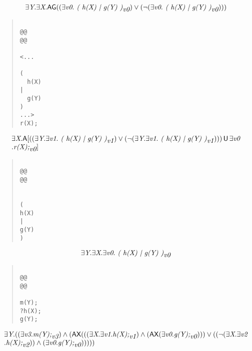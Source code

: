 \documentclass{article}
\newcommand{\U}{\,\mbox{\sf{U}}\,}
\newcommand{\A}{\mbox{\sf{A}}}
\newcommand{\AX}{\mbox{\sf{AX}}}
\newcommand{\AG}{\mbox{\sf{AG}}}
\newcommand{\mita}[1]{\mbox{\it{{#1}}}}
\begin{document}
\[\begin{array}{l}
\exists \mita{Y} . \exists \mita{X} . \AG((\exists \mita{v0} . \mita{
(
h(X)
|
g(Y)
)}_{\mita{v0}}) \vee (\neg (\exists \mita{v0} . \mita{
(
h(X)
|
g(Y)
)}_{\mita{v0}})))
\end{array}\]

\begin{quote}\begin{verbatim}

@@
@@

<...
  
(
  h(X)
|
  g(Y)
)
...>
r(X);
\end{verbatim}\end{quote}

\[\begin{array}{l}
\exists \mita{X} . \A[((\exists \mita{Y} . \exists \mita{v1} . \mita{
(
h(X)
|
g(Y)
)}_{\mita{v1}}) \vee (\neg (\exists \mita{Y} . \exists \mita{v1} . \mita{
(
h(X)
|
g(Y)
)}_{\mita{v1}}))) \U \exists \mita{v0}\\\mbox{} . \mita{r(X);}_{\mita{v0}}]

\end{array}\]

\begin{quote}\begin{verbatim}

@@
@@


(
h(X)
|
g(Y)
)
\end{verbatim}\end{quote}

\[\begin{array}{l}
\exists \mita{Y} . \exists \mita{X} . \exists \mita{v0} . \mita{
(
h(X)
|
g(Y)
)}_{\mita{v0}}
\end{array}\]

\begin{quote}\begin{verbatim}

@@
@@

m(Y);
?h(X);
g(Y);
\end{verbatim}\end{quote}

\[\begin{array}{l}
\exists \mita{Y} . ((\exists \mita{v3} . \mita{m(Y);}_{\mita{v3}}) \wedge (\AX(((\exists \mita{X} . \exists \mita{v1} . \mita{h(X);}_{\mita{v1}}) \wedge (\AX(\exists \mita{v0} . \mita{g(Y);}_{\mita{v0}}))) \vee ((\neg (\exists \mita{X} . \exists \mita{v2}\\\mbox{} . \mita{h(X);}_{\mita{v2}})) \wedge (\exists \mita{v0} . \mita{g(Y);}_{\mita{v0}})))))
\end{array}\]
\end{document}
